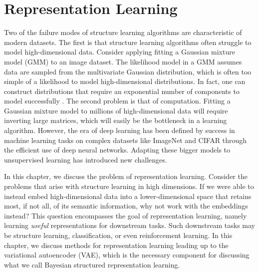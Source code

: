 \chapter{Representation Learning}

Two of the failure modes of structure learning
algorithms are
characteristic
of modern datasets.
The first is that structure learning
algorithms often struggle to 
model high-dimensional data.
Consider applying
fitting a Gaussian mixture
model (GMM) to an image dataset.
The likelihood model in a GMM
assumes data are sampled
from the multivariate Gaussian
distribution, which is
often too simple of a likelihood
to model high-dimensional distributions.
In fact, one can construct
distributions that require an
exponential number of components
to model successfully .
The second problem
is that of computation.
Fitting a Gaussian mixture model
to millions of high-dimensional data
will require inverting
large matrices, which will
easily be the bottleneck in a
learning algorithm.
However, the era of deep learning has
been defined by success in machine learning
tasks on
complex datasets
like ImageNet \citep{Deng2009} and CIFAR \citep{Krizhevsky2009}
through the efficient use of deep neural networks.
Adapting these bigger models
to
unsupervised learning has 
introduced new challenges.

In this chapter, we discuss the problem
of representation learning.
Consider the problems that arise 
with structure learning in high dimensions.
If we were able to instead embed 
high-dimensional data into a lower-dimensional space
that retains most, if not all,
of its semantic information,
why not work with the embeddings instead?
This question encompasses the goal
of representation learning, namely
learning \emph{useful} representations
for downstream tasks.
Such downstream tasks may
be structure learning, classification,
or even reinforcement learning.
In this chapter, we
discuss methods for representation learning
leading up to the variational autoencoder (VAE),
which is the necessary component
for discussing what we call Bayesian structured representation learning.

